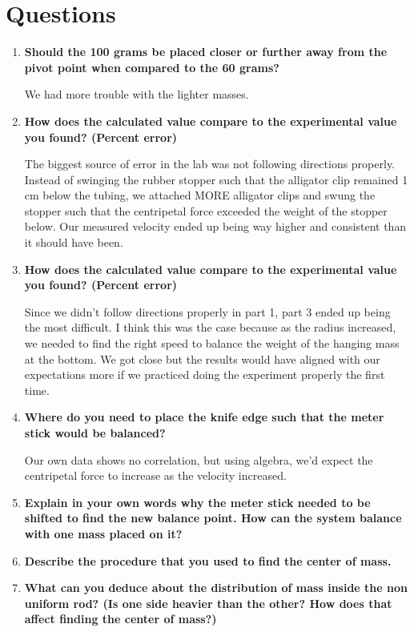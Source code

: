 
 \section{Questions}

\vspace{-0.5cm}
\singlespacing

\begin{enumerate}
	\item \textbf{Should the 100 grams be placed closer or further away from the pivot point when compared to the 60 grams?}

		We had more trouble with the lighter masses. 

	\item \textbf{How does the calculated value compare to the experimental value you found? (Percent error)}
 
	The biggest source of error in the lab was not following directions properly. Instead of swinging the rubber stopper such that the alligator clip remained 1 cm below the tubing, we attached MORE alligator clips and swung the stopper such that the centripetal force exceeded the weight of the stopper below. Our measured velocity ended up being way higher and consistent than it should have been. 

\item \textbf{How does the calculated value compare to the experimental value you found? (Percent error)}

Since we didn't follow directions properly in part 1, part 3 ended up being the most difficult. I think this was the case because as the radius increased, we needed to find the right speed to balance the weight of the hanging mass at the bottom. We got close but the results would have aligned with our expectations more if we practiced doing the experiment properly the first time.   

\item \textbf{Where do you need to place the knife edge such that the meter stick would be balanced?}

Our own data shows no correlation, but using algebra, we'd expect the centripetal force to increase as the velocity increased. 

\item \textbf{Explain in your own words why the meter stick needed to be shifted to find the new balance point. How can the system balance with one mass placed on it?}

\item \textbf{Describe the procedure that you used to find the center of mass.}

\item \textbf{What can you deduce about the distribution of mass inside the non uniform rod? (Is one side heavier than the other? How does that affect finding the center of mass?)}

\end{enumerate}

\newpage
